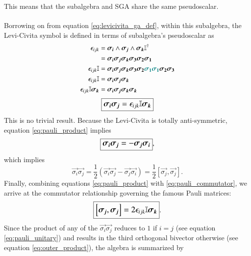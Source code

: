 This means that the subalgebra and SGA share the same pseudoscalar.
\\ \\ 
Borrowing on from equation \eqref{eq:levicivita_ga_def}, within this subalgebra, the Levi-Civita symbol is defined in terms of subalgebra's pseudoscalar as
\begin{align*}
    \epsilon_{ijk} &=  \vec{\sigma_i} \wedge \vec{\sigma_j} \wedge \vec{\sigma_k} \mathbb{I}^\dagger \\
                    &= \vec{\sigma_i} \vec{\sigma_j} \vec{\sigma_k} \vec{\sigma_3} \vec{\sigma_2} \vec{\sigma_1} \\
    \epsilon_{ijk} \mathbb{I} &= \vec{\sigma_i} \vec{\sigma_j} \vec{\sigma_k} \vec{\sigma_3}\vec{\sigma_2} \color{teal} \vec{\sigma_1} \vec{\sigma_1} \color{black} \vec{\sigma_2} \vec{\sigma_3} \\
    \epsilon_{ijk} \mathbb{I} &= \vec{\sigma_i} \vec{\sigma_j} \vec{\sigma_k} \\
    \epsilon_{ijk} \mathbb{I} \vec{\sigma_k} &= \vec{\sigma_i} \vec{\sigma_j} \vec{\sigma_k}  \vec{\sigma_k} 
\end{align*}
\begin{equation} \label{eq:pauli_product}
    \large \boxed{ \vec{\sigma_i} \vec{\sigma_j} = \epsilon_{ijk} \mathbb{I} \vec{\sigma_k}  }
\end{equation}
This is no trivial result. Because the Levi-Civita is totally anti-symmetric, equation \eqref{eq:pauli_product} implies
\begin{equation}
    \large \boxed{\vec{\sigma_i} \vec{\sigma_j} = - \vec{\sigma_j} \vec{\sigma_i}},
\end{equation}
which implies
\begin{equation} \label{eq:pauli_commutator}
    \vec{\sigma_i} \vec{\sigma_j} = \frac{1}{2} \left(  \vec{\sigma_i} \vec{\sigma_j} - \vec{\sigma_j} \vec{\sigma_i}  \right) = \frac{1}{2} \left[ \vec{\sigma_j}, \vec{\sigma_j} \right].
\end{equation}
Finally, combining equations \eqref{eq:pauli_product} with \eqref{eq:pauli_commutator}, we arrive at the commutator relationship governing the famous Pauli matrices:
\begin{equation}
    \large \boxed{ \left[ \vec{\sigma_j}, \vec{\sigma_j} \right] = 2 \epsilon_{ijk} \mathbb{I} \vec{\sigma_k}  }.
\end{equation}
Since the product of any of the $\vec{\sigma_i} \vec{\sigma_j} $ reduces to $1$ if $i=j$ (see equation \eqref{eq:pauli_unitary}) and results in the third orthogonal bivector otherwise (see equation \eqref{eq:outer_product}), the algebra is summarized by
